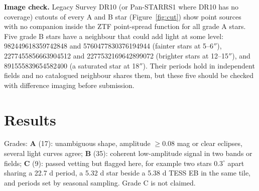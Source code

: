 \documentclass[11pt]{article}
\begin{document}
\textbf{Image check.} Legacy Survey DR10 (or Pan-STARRS1 where DR10 has no coverage) cutouts of every A and B star (Figure~\ref{fig:cut}) show point sources with no companion inside the ZTF point-spread function for all grade A stars. Five grade B stars have a neighbour that could add light at some level: 982449618359742848 and 5760477830376194944 (fainter stars at 5--6$''$), 2277455856663904512 and 2277532169642899072 (brighter stars at 12--15$''$), and 891555839654582400 (a saturated star at 18$''$). Their periods hold in independent fields and no catalogued neighbour shares them, but these five should be checked with difference imaging before submission.

\section{Results}
Grades: \textbf{A} (17): unambiguous shape, amplitude $\ge0.08$ mag or clear eclipses, several light curves agree; \textbf{B} (35): coherent low-amplitude signal in two bands or fields; \textbf{C} (9): passed vetting but flagged here, for example two stars $0.3^\circ$ apart sharing a 22.7 d period, a 5.32 d star beside a 5.38 d TESS EB in the same tile, and periods set by seasonal sampling. Grade C is not claimed.
\end{document}
